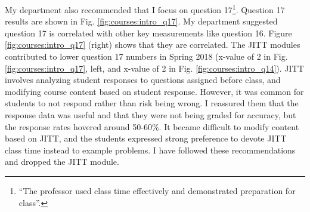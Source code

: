 \documentclass[../../main.tex]{subfiles}
\begin{document}
My department also recommended that I focus on question 17\footnote{``The professor used class time effectively and demonstrated preparation for class''.}.  Question 17 results are shown in Fig. \ref{fig:courses:intro_q17}.  My department suggested question 17 is correlated with other key measurements like question 16.  Figure \ref{fig:courses:intro_q17} (right) shows that they are correlated.  The JITT modules contributed to lower question 17 numbers in Spring 2018 (x-value of 2 in Fig. \ref{fig:courses:intro_q17}, left, and x-value of 2 in Fig. \ref{fig:courses:intro_q14}).  JITT involves analyzing student responses to questions assigned before class, and modifying course content based on student response.  However, it was common for students to not respond rather than risk being wrong.  I reassured them that the response data was useful and that they were not being graded for accuracy, but the response rates hovered around 50-60\%.  It became difficult to modify content based on JITT, and the students expressed strong preference to devote JITT class time instead to example problems.  I have followed these recommendations and dropped the JITT module.  \\ \hspace{0.1cm}
\end{document}
